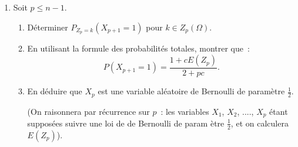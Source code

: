\begin{exercice}
\begin{enumerate}
\item Soit $p\leqslant n-1$.

\begin{enumerate}
\item D\'{e}terminer $P_{Z_{p}=k}(X_{p+1}=1)$ pour $k\in Z_{p}\left( \Omega
\right) $.

\item En utilisant la formule des probabilit\'{e}s totales, montrer que~: 
\begin{equation*}
P(X_{p+1}=1)=\frac{1+cE(Z_{p})}{2+pc}.
\end{equation*}

\item En d\'{e}duire que $X_{p}$ est une variable al\'{e}atoire de Bernoulli
de param\`{e}tre $\displaystyle\frac{1}{2}$.

(On raisonnera par r\'{e}currence sur $p$~: les variables $X_{1}$, $X_{2}$,
...., $X_{p}$ \'{e}tant suppos\'{e}es suivre une loi de de Bernoulli de param%
\`{e}tre $\displaystyle\frac{1}{2}$, et on calculera $E(Z_{p})$).
\end{enumerate}
\end{enumerate}

\end{exercice}


